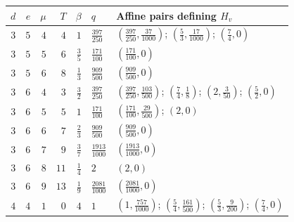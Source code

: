 \begin{center}
\scriptsize
\begin{tabular}{rrrrrlp{7.0cm}}
\hline
$d$ & $e$ & $\mu$ & $T$ & $\beta$ & $q$ & Affine pairs defining $H_v$ \\
\hline
\(3\) & \(5\) & \(4\) & \(4\) & \(1\) & \(\tfrac{397}{250}\) & \((\tfrac{397}{250},\tfrac{37}{1000})\); \((\tfrac{5}{3},\tfrac{17}{1000})\); \((\tfrac{7}{4},0)\) \\[3pt]
\(3\) & \(5\) & \(5\) & \(6\) & \(\tfrac{3}{5}\) & \(\tfrac{171}{100}\) & \((\tfrac{171}{100},0)\) \\[3pt]
\(3\) & \(5\) & \(6\) & \(8\) & \(\tfrac{1}{3}\) & \(\tfrac{909}{500}\) & \((\tfrac{909}{500},0)\) \\[3pt]
\(3\) & \(6\) & \(4\) & \(3\) & \(\tfrac{3}{2}\) & \(\tfrac{397}{250}\) & \((\tfrac{397}{250},\tfrac{103}{500})\); \((\tfrac{7}{4},\tfrac{1}{8})\); \((2,\tfrac{3}{50})\); \((\tfrac{5}{2},0)\) \\[3pt]
\(3\) & \(6\) & \(5\) & \(5\) & \(1\) & \(\tfrac{171}{100}\) & \((\tfrac{171}{100},\tfrac{29}{500})\); \((2,0)\) \\[3pt]
\(3\) & \(6\) & \(6\) & \(7\) & \(\tfrac{2}{3}\) & \(\tfrac{909}{500}\) & \((\tfrac{909}{500},0)\) \\[3pt]
\(3\) & \(6\) & \(7\) & \(9\) & \(\tfrac{3}{7}\) & \(\tfrac{1913}{1000}\) & \((\tfrac{1913}{1000},0)\) \\[3pt]
\(3\) & \(6\) & \(8\) & \(11\) & \(\tfrac{1}{4}\) & \(2\) & \((2,0)\) \\[3pt]
\(3\) & \(6\) & \(9\) & \(13\) & \(\tfrac{1}{9}\) & \(\tfrac{2081}{1000}\) & \((\tfrac{2081}{1000},0)\) \\[3pt]
\(4\) & \(4\) & \(1\) & \(0\) & \(4\) & \(1\) & \((1,\tfrac{757}{1000})\); \((\tfrac{5}{4},\tfrac{161}{500})\); \((\tfrac{5}{3},\tfrac{9}{200})\); \((\tfrac{7}{4},0)\) \\[3pt]
\hline
\end{tabular}
\end{center}
